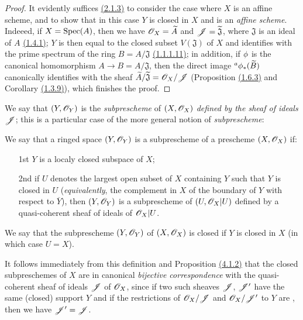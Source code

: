 \begin{proof}
\label{proof-prop-1.4.1.2}
It evidently suffices \hyperref[prop-1.2.1.3]{(2.1.3)} to consider the case where $X$ is an
affine scheme, and to show that in this case $Y$ is closed in $X$ and is an {\it affine
scheme}. Indeeed, if $X={\mathop{\mathrm{Spec}}\nolimits}(A)$, then we have $\mathscr{O}_X=\widetilde{A}$ and
$\mathscr{J}=\widetilde{\mathfrak{J}}$, where $\mathfrak{J}$ is an ideal of $A$
\hyperref[thm-1.1.4.1]{(1.4.1)}; $Y$ is then equal to the closed subset $V(\mathfrak{J})$ of
$X$ and identifies with the prime spectrum of the ring $B=A/\mathfrak{J}$
\hyperref[prop-1.1.1.11]{(1.1.1.11)}; in addition, if $\phi$ is the canonical
homomorphism $A\to B=A/\mathfrak{J}$, then the direct image ${}^a\phi_*(\widetilde{B})$
canonically identifies with the sheaf $\widetilde{A}/\widetilde{\mathfrak{J}}=\mathscr{O}_X/\mathscr{J}$
(Proposition \hyperref[prop-1.1.6.3]{(1.6.3)} and Corollary \hyperref[cor-1.1.3.9]{(1.3.9)}),
which finishes the proof.
\end{proof}

We say that $(Y,\mathscr{O}_Y)$ is the {\it subprescheme} of $(X,\mathscr{O}_X)$ {\it defined by the
sheaf of ideals $\mathscr{J}$}; this is a particular case of the more general notion of
{\it subprescheme}:

\begin{defn}[4.1.3]
\label{defn-1.4.1.3}
We say that a ringed space $(Y,\mathscr{O}_Y)$ is a subprescheme of a prescheme $(X,\mathscr{O}_X)$ if:
\begin{itemize}
  \item[1st] $Y$ is a localy closed subspace of $X$;
  \item[2nd] if $U$ denotes the largest open subset of $X$ containing $Y$ such that
             $Y$ is closed in $U$ ({\it equivalently}, the complement in $X$ of the
             boundary of $Y$ with respect to $\overline{Y}$), then $(Y,\mathscr{O}_Y)$ is
             a subprescheme of $(U,\mathscr{O}_X|U)$ defined by a quasi-coherent sheaf of ideals of
             $\mathscr{O}_X|U$.
\end{itemize}
We say that the subprescheme $(Y,\mathscr{O}_Y)$ of $(X,\mathscr{O}_X)$ is closed if $Y$ is closed in $X$
(in which case $U=X$).
\end{defn}

It follows immediately from this definition and Proposition \hyperref[prop-1.4.1.2]{(4.1.2)}
that the closed subpreschemes of $X$ are in canonical {\it bijective correspondence} with the
quasi-coherent sheaf of ideals $\mathscr{J}$ of $\mathscr{O}_X$, since if two such sheaves
$\mathscr{J}$, $\mathscr{J}'$ have the same (closed) support $Y$ and if the restrictions of
$\mathscr{O}_X/\mathscr{J}$ and $\mathscr{O}_X/\mathscr{J}'$ to $Y$ are , then we have $\mathscr{J}'=\mathscr{J}$.

